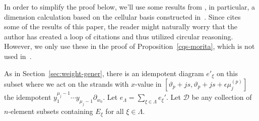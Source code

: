 \documentclass[ALCO,ThmDefs,Unicode,epreuves]{cedram}
\begin{document}
In order to simplify the proof below, we'll use some results from
\cite{WebRou}, in particular, a dimension calculation based on the
cellular basis constructed in~\cite[Thm.~2.26]{WebRou}. Since
\cite{WebRou} cites some of the results of this paper, the reader
might naturally worry that the author has created a loop of citations
and thus utilized circular reasoning. However, we only use these in the
proof of Proposition~\ref{cqs-morita}, which is not used in~\cite{WebRou}.




As in
Section~\ref{sec:weight-gener}, there is an idempotent diagram
$e'_\xi$ on this
subset where we act on the strands with $x$-value in $[
\vartheta_p+js,\vartheta_p+js+\epsilon\mu^{(p)}_j]$ the idempotent 
$y^{\mu_j-1}_1\cdots y_{\mu_j-1}\partial_{w_0}$. Let
$e_\Lambda=\sum_{\xi\in \Lambda} e_\xi'$. Let $\mathscr{D}$ be any
collection of $n$-element subsets containing $E_\xi$ for all $\xi\in \Lambda$.
\end{document}

